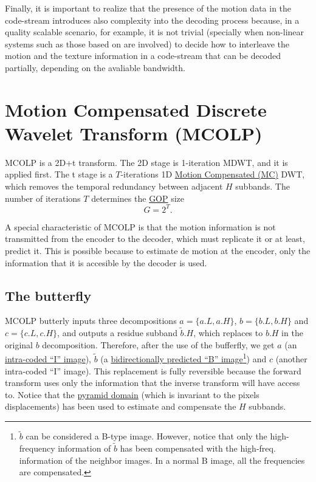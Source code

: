 Finally, it is important to realize that the presence of the motion
data in the code-stream introduces also complexity into the decoding
process because, in a quality scalable scenario, for example, it is
not trivial (specially when non-linear systems such as those based on
 are involved) to decide how to
interleave the motion and the texture information in a code-stream
that can be decoded partially, depending on the avaliable bandwidth.


\section{Motion Compensated Discrete Wavelet Transform (MCOLP)}
MCOLP is a 2D+t transform. The 2D stage is 1-iteration MDWT, and it is
applied first. The t stage is a $T$-iterations 1D
\href{https://en.wikipedia.org/wiki/Motion_compensation}{Motion
  Compensated (MC)} DWT, which removes the temporal redundancy between
adjacent $H$ subbands. The number of iterations $T$ determines the
\href{https://en.wikipedia.org/wiki/Group_of_pictures}{GOP} size
\begin{equation}
  G=2^T.
  \label{eq:GOP_size}
\end{equation}

A special characteristic of MCOLP is that the motion information is
not transmitted from the encoder to the decoder, which must replicate
it or at least, predict it. This is possible because to estimate de
motion at the encoder, only the information that it is accesible by
the decoder is used.

\subsection{The butterfly}
MCOLP butterly inputs three decompositions $a=\{a.L, a.H\}$, $b=\{b.L,
b.H\}$ and $c=\{c.L, c.H\}$, and outputs a residue subband
$\tilde{b}.H$, which replaces to $b.H$ in the original $b$
decomposition. Therefore, after the use of the bufferfly,
we get $a$ (an
\href{https://en.wikipedia.org/wiki/Video_compression_picture_types}{intra-coded
  ``I'' image}), $\tilde{b}$ (a
\href{https://en.wikipedia.org/wiki/Video_compression_picture_types}{bidirectionally
  predicted ``B'' image}\footnote{$\tilde{b}$ can be considered a
  B-type image. However, notice that only the high-frequency
  information of $\tilde{b}$ has been compensated with the
  high-freq. information of the neighbor images. In a normal B image,
  all the frequencies are compensated.}) and $c$ (another intra-coded
``I'' image). This replacement is fully reversible because the forward
transform uses only the information that the inverse transform will
have access to. Notice that the
\href{http://www.vtvt.ece.vt.edu/research/references/video/DCT_Video_Compression/Zhang92a.pdf}{pyramid
  domain} (which is invariant to the pixels displacements) has been
used to estimate and compensate the $H$ subbands.

